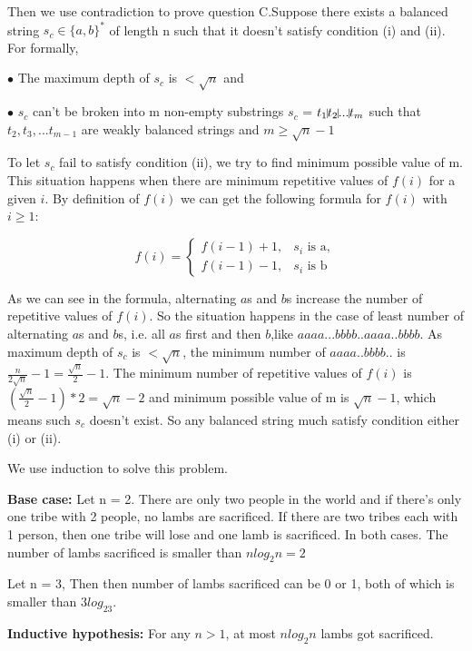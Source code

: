\documentclass[12pt,a4paper]{article}
\newcommand{\question}[1]{\bigskip\noindent{\textbf{Q{#1} solution}}}
\begin{document}
Then we use contradiction to prove question C.Suppose there exists a balanced string $s_c \in \{a,b\}^*$ of length n such that it doesn't satisfy condition (i) and (ii). For formally,

$\bullet$ The maximum depth of $s_c$ is $<\sqrt{n}$ and 

$\bullet$ $s_c$ can't be broken into m non-empty substrings $s_c$ = $t_1\vline t_2\vline ... \vline t_m$ such that $t_2,t_3,...t_{m-1}$ are weakly balanced strings and $m \ge \sqrt{n} - 1$

To let $s_c$ fail to satisfy condition (ii), we try to find minimum possible value of m. This situation happens when there are minimum repetitive values of $f(i)$ for a given $i$. By definition of $f(i)$ we can get the following formula for $f(i)$ with $i \ge 1$:

\begin{equation*}
	f(i)=
	\begin{cases}
		f(i - 1) + 1, & s_i \mbox{ is a},\\
		f(i - 1) - 1, & s_i \mbox{ is b}
	\end{cases}
\end{equation*}

As we can see in the formula, alternating $a$s and $b$s increase the number of repetitive values of $f(i)$. So the situation happens in the case of least number of alternating $a$s and $b$s, i.e. all $a$s first and then $b$,like $aaaa...bbbb..aaaa..bbbb$. As maximum depth of $s_c$ is $<\sqrt{n}$, the minimum number of $aaaa..bbbb..$ is $ \frac{n}{2\sqrt{n}} - 1 = \frac{\sqrt{n}}{2} - 1$. The minimum number of repetitive values of $f(i)$ is ${ (\frac{\sqrt{n}}{2} - 1) * 2} = \sqrt{n} - 2$ and minimum possible value of m is $\sqrt{n} - 1$, which means such $s_c$ doesn't exist. So any balanced string much satisfy condition either (i) or (ii).

\question{2}

We use induction to solve this problem. 

\textbf{Base case:} Let n = 2. There are only two people in the world and if there's only one tribe with 2 people, no lambs are sacrificed. If there are two tribes each with 1 person, then one tribe will lose and one lamb is sacrificed. In both cases. The number of lambs sacrificed is smaller than $nlog_2n = 2$

Let n = 3, Then then number of lambs sacrificed can be 0 or 1, both of which is smaller than $3log_23$.

\textbf{Inductive hypothesis:} For any $n > 1$, at most $nlog_2n$ lambs got sacrificed.
\end{document}
